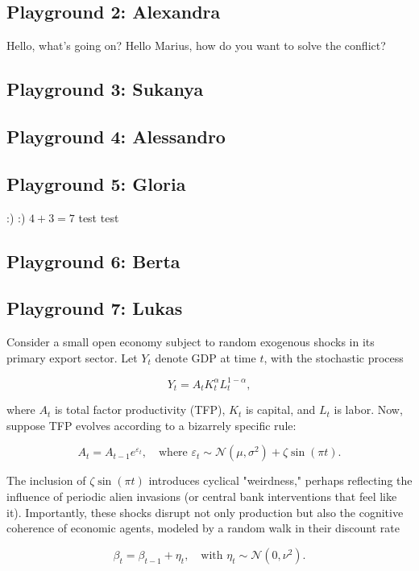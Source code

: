 \documentclass{article}
\begin{document}
\subsection{Playground 2: Alexandra}
Hello, what's going on? Hello Marius, how do you want to solve the conflict?

\subsection{Playground 3: Sukanya}

\subsection{Playground 4: Alessandro}

\subsection{Playground 5: Gloria}
:)
:)
$4+3=7$
test test
\subsection{Playground 6: Berta}

\subsection{Playground 7: Lukas}
Consider a small open economy subject to random exogenous shocks in its primary export sector. Let \( Y_t \) denote GDP at time \( t \), with the stochastic process 

\[
Y_t = A_t K_t^\alpha L_t^{1-\alpha},
\]

where \( A_t \) is total factor productivity (TFP), \( K_t \) is capital, and \( L_t \) is labor. Now, suppose TFP evolves according to a bizarrely specific rule: 

\[
A_t = A_{t-1} e^{\varepsilon_t}, \quad \text{where } \varepsilon_t \sim \mathcal{N}(\mu, \sigma^2) + \zeta \sin(\pi t).
\]

The inclusion of \( \zeta \sin(\pi t) \) introduces cyclical "weirdness," perhaps reflecting the influence of periodic alien invasions (or central bank interventions that feel like it). Importantly, these shocks disrupt not only production but also the cognitive coherence of economic agents, modeled by a random walk in their discount rate 

\[
\beta_t = \beta_{t-1} + \eta_t, \quad \text{with } \eta_t \sim \mathcal{N}(0, \nu^2).
\]
\end{document}
